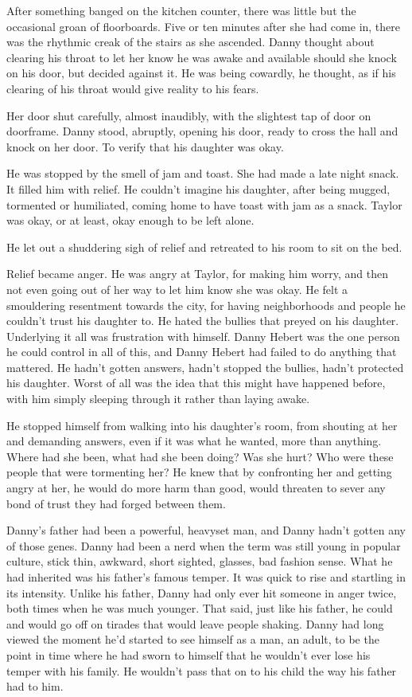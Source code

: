 After something banged on the kitchen counter, there was little but the occasional groan of floorboards. Five or ten minutes after she had come in, there was the rhythmic creak of the stairs as she ascended. Danny thought about clearing his throat to let her know he was awake and available should she knock on his door, but decided against it. He was being cowardly, he thought, as if his clearing of his throat would give reality to his fears.

Her door shut carefully, almost inaudibly, with the slightest tap of door on doorframe. Danny stood, abruptly, opening his door, ready to cross the hall and knock on her door. To verify that his daughter was okay.

He was stopped by the smell of jam and toast. She had made a late night snack. It filled him with relief. He couldn't imagine his daughter, after being mugged, tormented or humiliated, coming home to have toast with jam as a snack. Taylor was okay, or at least, okay enough to be left alone.

He let out a shuddering sigh of relief and retreated to his room to sit on the bed.

Relief became anger. He was angry at Taylor, for making him worry, and then not even going out of her way to let him know she was okay. He felt a smouldering resentment towards the city, for having neighborhoods and people he couldn't trust his daughter to. He hated the bullies that preyed on his daughter. Underlying it all was frustration with himself. Danny Hebert was the one person he could control in all of this, and Danny Hebert had failed to do anything that mattered. He hadn't gotten answers, hadn't stopped the bullies, hadn't protected his daughter. Worst of all was the idea that this might have happened before, with him simply sleeping through it rather than laying awake.

He stopped himself from walking into his daughter's room, from shouting at her and demanding answers, even if it was what he wanted, more than anything. Where had she been, what had she been doing? Was she hurt? Who were these people that were tormenting her? He knew that by confronting her and getting angry at her, he would do more harm than good, would threaten to sever any bond of trust they had forged between them.

Danny's father had been a powerful, heavyset man, and Danny hadn't gotten any of those genes. Danny had been a nerd when the term was still young in popular culture, stick thin, awkward, short sighted, glasses, bad fashion sense. What he had inherited was his father's famous temper. It was quick to rise and startling in its intensity. Unlike his father, Danny had only ever hit someone in anger twice, both times when he was much younger. That said, just like his father, he could and would go off on tirades that would leave people shaking. Danny had long viewed the moment he'd started to see himself as a man, an adult, to be the point in time where he had sworn to himself that he wouldn't ever lose his temper with his family. He wouldn't pass that on to his child the way his father had to him.

